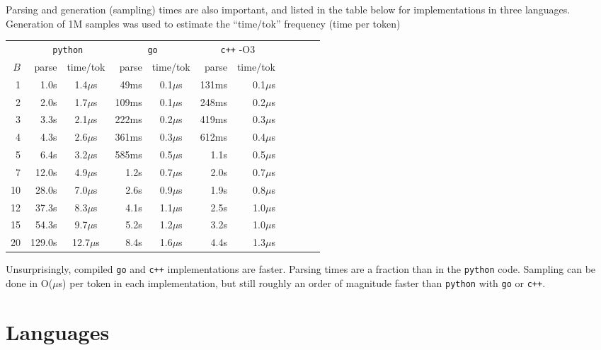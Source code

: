 \documentclass[11pt, oneside]{amsart}   	%
\begin{document}
Parsing and generation (sampling) times are also important, and listed in the table below for implementations in three languages. Generation of 1M samples was used to estimate the ``time/tok'' frequency (time per token) 
\begin{center}
\begin{small}
\begin{tabular}{ r r c r c r r r r r r}
  & \multicolumn{2}{c}{\texttt{python}} & \multicolumn{2}{c}{\texttt{go}} & \multicolumn{2}{c}{\texttt{c++} -O3} \\
 $B$ & parse & time/tok & parse & time/tok & parse & time/tok \\ \hline
 1 & 1.0s & 1.4$\mu$s & 49ms & 0.1$\mu$s & 131ms & 0.1$\mu$s \\  
 2 & 2.0s & 1.7$\mu$s & 109ms & 0.1$\mu$s & 248ms & 0.2$\mu$s \\  
 3 & 3.3s & 2.1$\mu$s & 222ms & 0.2$\mu$s & 419ms & 0.3$\mu$s \\
 4 & 4.3s & 2.6$\mu$s & 361ms & 0.3$\mu$s & 612ms & 0.4$\mu$s \\
 5 & 6.4s & 3.2$\mu$s & 585ms & 0.5$\mu$s & 1.1s & 0.5$\mu$s \\
 7 & 12.0s & 4.9$\mu$s & 1.2s & 0.7$\mu$s & 2.0s & 0.7$\mu$s \\
 10 & 28.0s & 7.0$\mu$s & 2.6s & 0.9$\mu$s & 1.9s & 0.8$\mu$s \\  
 12 & 37.3s & 8.3$\mu$s & 4.1s & 1.1$\mu$s & 2.5s & 1.0$\mu$s \\
 15 & 54.3s & 9.7$\mu$s & 5.2s & 1.2$\mu$s & 3.2s & 1.0$\mu$s \\  
 20 & 129.0s & 12.7$\mu$s & 8.4s & 1.6$\mu$s & 4.4s & 1.3$\mu$s \\  \hline
\end{tabular}
\end{small}
\end{center}
Unsurprisingly, compiled \texttt{go} and \texttt{c++} implementations are faster. Parsing times are a fraction than in the \texttt{python} code. Sampling can be done in O($\mu$s) per token in each implementation, but still roughly an order of magnitude faster than \texttt{python} with \texttt{go} or \texttt{c++}. 

\section{Languages}
\end{document}
